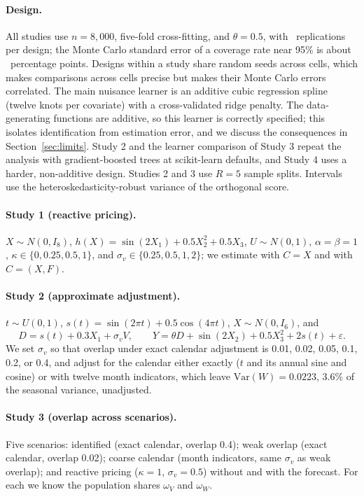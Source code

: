 \documentclass[11pt]{article}
\theoremstyle{remark}
\newcommand{\Var}{\mathrm{Var}}
\begin{document}
\paragraph{Design.} All studies use $n = 8{,}000$, five-fold cross-fitting, and $\theta = 0.5$, with \Reps\ replications per design; the Monte Carlo standard error of a coverage rate near 95\% is about \MCSEcov\ percentage points. Designs within a study share random seeds across cells, which makes comparisons across cells precise but makes their Monte Carlo errors correlated. The main nuisance learner is an additive cubic regression spline (twelve knots per covariate) with a cross-validated ridge penalty. The data-generating functions are additive, so this learner is correctly specified; this isolates identification from estimation error, and we discuss the consequences in Section~\ref{sec:limits}. Study 2 and the learner comparison of Study 3 repeat the analysis with gradient-boosted trees at scikit-learn defaults, and Study 4 uses a harder, non-additive design. Studies 2 and 3 use $R = 5$ sample splits. Intervals use the heteroskedasticity-robust variance of the orthogonal score.

\paragraph{Study 1 (reactive pricing).} $X \sim N(0, I_8)$, $h(X) = \sin(2X_1) + 0.5X_2^2 + 0.5X_3$, $U \sim N(0, 1)$, $\alpha = \beta = 1$, $\kappa \in \{0, 0.25, 0.5, 1\}$, and $\sigma_v \in \{0.25, 0.5, 1, 2\}$; we estimate with $C = X$ and with $C = (X, F)$.

\paragraph{Study 2 (approximate adjustment).} $t \sim U(0, 1)$, $s(t) = \sin(2\pi t) + 0.5\cos(4\pi t)$, $X \sim N(0, I_6)$, and
\[
D = s(t) + 0.3X_1 + \sigma_v V, \qquad Y = \theta D + \sin(2X_2) + 0.5X_3^2 + 2s(t) + \varepsilon.
\]
We set $\sigma_v$ so that overlap under exact calendar adjustment is 0.01, 0.02, 0.05, 0.1, 0.2, or 0.4, and adjust for the calendar either exactly ($t$ and its annual sine and cosine) or with twelve month indicators, which leave $\Var(W) = 0.0223$, 3.6\% of the seasonal variance, unadjusted.

\paragraph{Study 3 (overlap across scenarios).} Five scenarios: identified (exact calendar, overlap 0.4); weak overlap (exact calendar, overlap 0.02); coarse calendar (month indicators, same $\sigma_v$ as weak overlap); and reactive pricing ($\kappa = 1$, $\sigma_v = 0.5$) without and with the forecast. For each we know the population shares $\omega_V$ and $\omega_W$.
\end{document}
